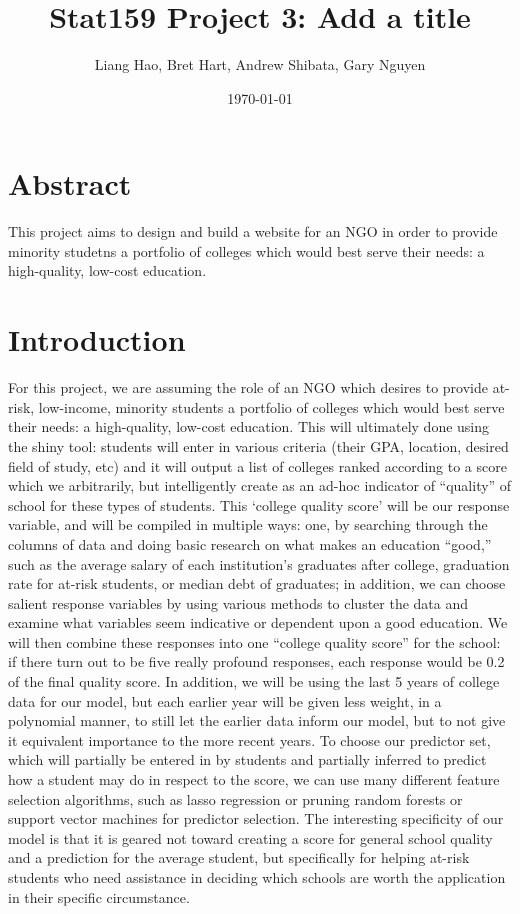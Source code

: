 \documentclass{article}\usepackage[]{graphicx}\usepackage[]{color}
\title{Stat159 Project 3: Add a title}
\author{Liang Hao, Bret Hart, Andrew Shibata, Gary Nguyen}
\date{\today}
\begin{document}
\maketitle
\section{Abstract}

This project aims to design and build a website for an NGO in order to provide minority studetns a portfolio of colleges which would best serve their needs: a high-quality, low-cost education.



\maketitle
\section{Introduction}

For this project, we are assuming the role of an NGO which desires to provide at-risk, low-income, minority students a portfolio of colleges which would best serve their needs: a high-quality, low-cost education. This will ultimately done using the shiny tool: students will enter in various criteria (their GPA, location, desired field of study, etc) and it will output a list of colleges ranked according to a score which we arbitrarily, but intelligently create as an ad-hoc indicator of “quality” of school for these types of students. This ‘college quality score’ will be our response variable, and will be compiled in multiple ways: one, by searching through the columns of data and doing basic research on what makes an education “good,” such as the average salary of each institution’s graduates after college, graduation rate for at-risk students, or median debt of graduates; in addition, we can choose salient response variables by using various methods to cluster the data and examine what variables seem indicative or dependent upon a good education. We will then combine these responses into one “college quality score” for the school: if there turn out to be five really profound responses, each response would be 0.2 of the final quality score. In addition, we will be using the last 5 years of college data for our model, but each earlier year will be given less weight, in a polynomial manner, to still let the earlier data inform our model, but to not give it equivalent importance to the more recent years. To choose our predictor set, which will partially be entered in by students and partially inferred to predict how a student may do in respect to the score, we can use many different feature selection algorithms, such as lasso regression or pruning random forests or support vector machines for predictor selection. The interesting specificity of our model is that it is geared not toward creating a score for general school quality and a prediction for the average student, but specifically for helping at-risk students who need assistance in deciding which schools are worth the application in their specific circumstance.
\end{document}
